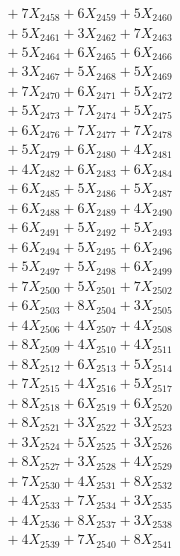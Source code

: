 \documentclass[a4paper,10pt]{article}
\begin{document}
{\begin{align}
&\;  + 7 X_{2458} + 6 X_{2459} + 5 X_{2460} \\[0.3ex]
&\;  + 5 X_{2461} + 3 X_{2462} + 7 X_{2463} \\[0.3ex]
&\;  + 5 X_{2464} + 6 X_{2465} + 6 X_{2466} \\[0.3ex]
&\;  + 3 X_{2467} + 5 X_{2468} + 5 X_{2469} \\[0.5ex]\allowbreak
&\;  + 7 X_{2470} + 6 X_{2471} + 5 X_{2472} \\[0.3ex]
&\;  + 5 X_{2473} + 7 X_{2474} + 5 X_{2475} \\[0.3ex]
&\;  + 6 X_{2476} + 7 X_{2477} + 7 X_{2478} \\[0.3ex]
&\;  + 5 X_{2479} + 6 X_{2480} + 4 X_{2481} \\[0.3ex]
&\;  + 4 X_{2482} + 6 X_{2483} + 6 X_{2484} \\[0.3ex]
&\;  + 6 X_{2485} + 5 X_{2486} + 5 X_{2487} \\[0.3ex]
&\;  + 6 X_{2488} + 6 X_{2489} + 4 X_{2490} \\[0.3ex]
&\;  + 6 X_{2491} + 5 X_{2492} + 5 X_{2493} \\[0.3ex]
&\;  + 6 X_{2494} + 5 X_{2495} + 6 X_{2496} \\[0.3ex]
&\;  + 5 X_{2497} + 5 X_{2498} + 6 X_{2499} \\[0.5ex]\allowbreak
&\;  + 7 X_{2500} + 5 X_{2501} + 7 X_{2502} \\[0.3ex]
&\;  + 6 X_{2503} + 8 X_{2504} + 3 X_{2505} \\[0.3ex]
&\;  + 4 X_{2506} + 4 X_{2507} + 4 X_{2508} \\[0.3ex]
&\;  + 8 X_{2509} + 4 X_{2510} + 4 X_{2511} \\[0.3ex]
&\;  + 8 X_{2512} + 6 X_{2513} + 5 X_{2514} \\[0.3ex]
&\;  + 7 X_{2515} + 4 X_{2516} + 5 X_{2517} \\[0.3ex]
&\;  + 8 X_{2518} + 6 X_{2519} + 6 X_{2520} \\[0.3ex]
&\;  + 8 X_{2521} + 3 X_{2522} + 3 X_{2523} \\[0.3ex]
&\;  + 3 X_{2524} + 5 X_{2525} + 3 X_{2526} \\[0.3ex]
&\;  + 8 X_{2527} + 3 X_{2528} + 4 X_{2529} \\[0.5ex]\allowbreak
&\;  + 7 X_{2530} + 4 X_{2531} + 8 X_{2532} \\[0.3ex]
&\;  + 4 X_{2533} + 7 X_{2534} + 3 X_{2535} \\[0.3ex]
&\;  + 4 X_{2536} + 8 X_{2537} + 3 X_{2538} \\[0.3ex]
&\;  + 4 X_{2539} + 7 X_{2540} + 8 X_{2541} \\[0.3ex]

\end{align}}
\end{document}
